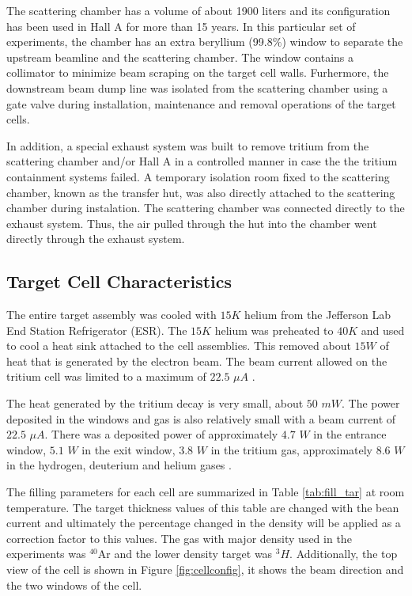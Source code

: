 \documentclass[final,5p,times,twocolumn,balance]{elsarticle}
\begin{document}
The scattering chamber has a volume of about 1900 liters and its configuration has been used in Hall A for more than 15 years. 
In this particular set of experiments, the chamber has an extra beryllium (99.8$\%$) window to separate the upstream beamline 
and the scattering chamber. The window contains a collimator to minimize beam scraping on the target cell walls. Furhermore, 
the downstream beam dump line was isolated from the scattering chamber using a gate valve during installation, maintenance and removal operations of the target cells. 

In addition, a special exhaust system was built to remove tritium from the scattering chamber and/or Hall A in a controlled manner 
in case the the tritium containment systems failed. A temporary isolation room fixed to the scattering chamber, known as 
the transfer hut, was also directly attached to the scattering chamber during instalation. The scattering chamber was connected directly to the exhaust system. Thus, the air pulled through the hut into the chamber went directly through the exhaust system.  


\subsection{Target Cell Characteristics}

The entire target assembly was cooled with $15K$ helium from the Jefferson Lab End Station Refrigerator (ESR). The $15K$ helium was preheated to $40K$ and used to cool a heat sink attached to the cell assemblies. This removed about $15W$ of heat that is generated by the electron beam. 
The beam current allowed on the tritium cell was limited to a maximum of $22.5$ $\mu A$ \cite{engreport}.

The heat generated by the tritium decay is very small, about $50$ $mW$. The power deposited in the windows and gas is also relatively 
small with a beam current of $22.5$ $\mu A$. There was a deposited power of approximately $4.7$ $W$ in the entrance window, $5.1$ $W$ 
in the exit window, $3.8$ $W$ in the tritium gas, approximately $8.6$ $W$ in the hydrogen, deuterium and helium gases \cite{celldes}.
 
The filling parameters for each cell are summarized in Table \ref{tab:fill_tar} at room temperature. The target thickness values of this table are changed with the bean current and ultimately the percentage changed in the density will be applied as a correction factor to this values. The gas with major density used in the experiments was $^{40}$Ar and the lower density target was $^{3}H$.  Additionally, the top view of the cell is shown in Figure \ref{fig:cellconfig},  it shows the beam direction and the two windows of the cell.
\end{document}
